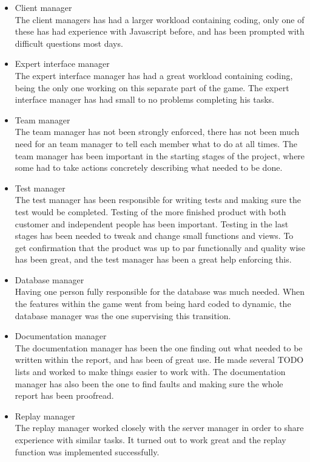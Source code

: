 \begin{itemize}
	\item Client manager\\
The client managers has had a larger workload containing coding, only one of these has had experience with Javascript before, and has been prompted with difficult questions most days.
	\item Expert interface manager\\
The expert interface manager has had a great workload containing coding, being the only one working on this separate part of the game. The expert interface manager has had small to no problems completing his tasks.
	\item Team manager\\
The team manager has not been strongly enforced, there has not been much need for an team manager to tell each member what to do at all times. The team manager has been important in the starting stages of the project, where some had to take actions concretely describing what needed to be done. 
	\item Test manager\\
The test manager has been responsible for writing tests and making sure the test would be completed. Testing of the more finished product with both customer and independent people has been important. Testing in the last stages has been needed to tweak and change small functions and views. To get confirmation that the product was up to par functionally and quality wise has been great, and the test manager has been a great help enforcing this.
	\item Database manager\\
Having one person fully responsible for the database was much needed. When the features within the game went from being hard coded to dynamic, the database manager was the one supervising this transition. 
	\item Documentation manager\\
The documentation manager has been the one finding out what needed to be written within the report, and has been of great use. He made several TODO lists and worked to make things easier to work with. The documentation manager has also been the one to find faults and making sure the whole report has been proofread.
	\item Replay manager\\
The replay manager worked closely with the server manager in order to share experience with similar tasks. It turned out to work great and the replay function was implemented successfully.
\end{itemize}


